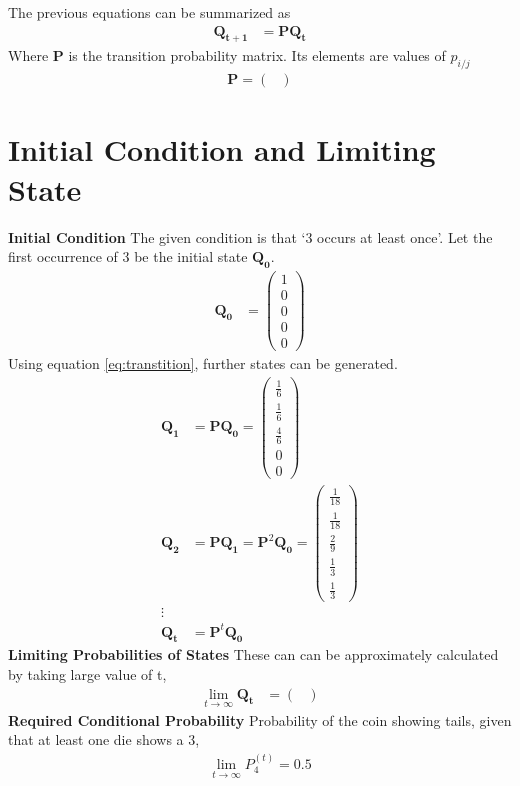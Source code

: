 \documentclass[journal,12pt,two column]{IEEEtran}
\providecommand{\prt}[2]{\ensuremath{P_{#1}^{\left(#2\right)} }}        %
\theoremstyle{remark}
\newcommand{\myvec}[1]{\ensuremath{\begin{pmatrix}#1\end{pmatrix}}}
\let\vec\mathbf
\begin{document}
    The previous equations can be summarized as
    \begin{align}
        \vec{Q_{t+1}} &= \vec{P}\vec{Q_t} 
        \label{eq:transtition}        
    \end{align}
    Where $\vec{P}$ is the transition probability matrix. Its elements are values of $p_{i/j}$
    \begin{align}
        \vec{P}= \myvec{} 
    \end{align}

\section{Initial Condition and Limiting State}
\textbf{Initial Condition}
     The given condition is that \lq3 occurs at least once\rq. Let the first occurrence of 3 be the initial state $ \vec{Q_0}$.
    \begin{align}
        \vec{Q_0} &= \myvec{ 1 \\ 0 \\ 0 \\ 0 \\ 0 } 
    \end{align}
    Using equation \eqref{eq:transtition}, further states can be generated.
    \begin{align}
        \vec{Q_1} &= \vec{P} \vec{Q_{0}}
            = \myvec{\frac{1}{6} \\ \frac{1}{6}  \\ \frac{4}{6} \\ 0 \\ 0}\\
        \vec{Q_2} &= \vec{P} \vec{Q_1} = \vec{P}^{2} \vec{Q_0} 
            = \myvec{\frac{1}{18} \\ \frac{1}{18} \\ \frac{2}{9} \\\frac{1}{3} \\ \frac{1}{3}}\\   
        \vdots \\
        \vec{Q_t} &= \vec{P}^{t} \vec{Q_0}
    \end{align}
\textbf{Limiting Probabilities of States}
    These can can be approximately calculated by taking large value of t,
    \begin{align}
       \lim_{t \to \infty}  \vec{Q_t} &= 
       \myvec{} 
    \end{align}
\textbf{Required Conditional Probability}
    Probability of the coin showing tails, given that at least one die shows a 3,
    \begin{align}
       \lim_{t \to \infty} \prt{4}{t} = 0.5
    \end{align}
    
\end{document}
